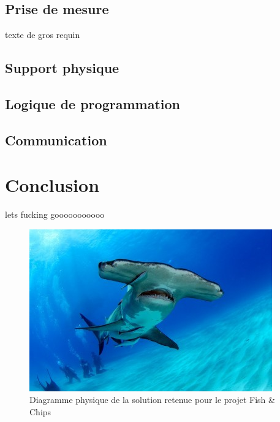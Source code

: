 \clearpage

\subsection{Prise de mesure}

texte de gros requin

\subsection{Support physique}

\subsection{Logique de programmation}

\subsection{Communication}


\section{Conclusion}

lets fucking gooooooooooo

\begin{figure}
    \centering
    \includegraphics[width=\linewidth]{fig/requinmarto.jpg}
    \caption{Diagramme physique de la solution retenue pour le projet Fish \& Chips}
    \label{fig:concept_retenu}
\end{figure}

